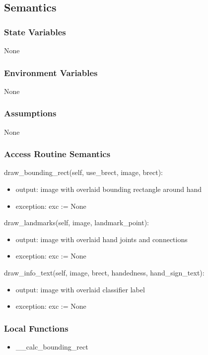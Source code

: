 \documentclass[12pt, titlepage]{article}
\begin{document}
\subsection{Semantics}

\subsubsection{State Variables}

None

\subsubsection{Environment Variables}

None

\subsubsection{Assumptions}

None

\subsubsection{Access Routine Semantics}

\noindent draw\_bounding\_rect(self, use\_brect, image, brect):
\begin{itemize}
\item output: image with overlaid bounding rectangle around hand
\item exception: exc := None
\end{itemize}

\noindent draw\_landmarks(self, image, landmark\_point):
\begin{itemize}
\item output: image with overlaid hand joints and connections
\item exception: exc := None
\end{itemize}

\noindent draw\_info\_text(self, image, brect, handedness, hand\_sign\_text):
\begin{itemize}
\item output:  image with overlaid classifier label
\item exception: exc := None
\end{itemize}

\subsubsection{Local Functions}
\begin{itemize}
\item \_\_calc\_bounding\_rect
\end{itemize}
\end{document}
